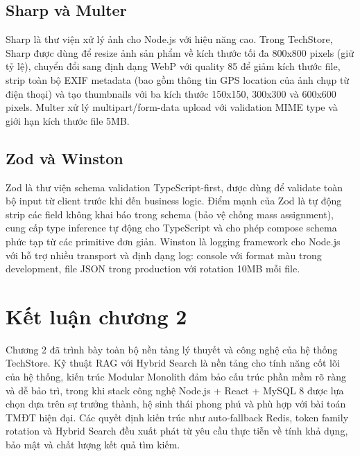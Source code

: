 \subsection{Sharp và Multer}

Sharp là thư viện xử lý ảnh cho Node.js với hiệu năng cao. Trong TechStore, Sharp được dùng để resize ảnh sản phẩm về kích thước tối đa 800x800 pixels (giữ tỷ lệ), chuyển đổi sang định dạng WebP với quality 85 để giảm kích thước file, strip toàn bộ EXIF metadata (bao gồm thông tin GPS location của ảnh chụp từ điện thoại) và tạo thumbnails với ba kích thước 150x150, 300x300 và 600x600 pixels. Multer xử lý multipart/form-data upload với validation MIME type và giới hạn kích thước file 5MB.

\subsection{Zod và Winston}

Zod là thư viện schema validation TypeScript-first, được dùng để validate toàn bộ input từ client trước khi đến business logic. Điểm mạnh của Zod là tự động strip các field không khai báo trong schema (bảo vệ chống mass assignment), cung cấp type inference tự động cho TypeScript và cho phép compose schema phức tạp từ các primitive đơn giản. Winston là logging framework cho Node.js với hỗ trợ nhiều transport và định dạng log: console với format màu trong development, file JSON trong production với rotation 10MB mỗi file.

\section*{Kết luận chương 2}

Chương 2 đã trình bày toàn bộ nền tảng lý thuyết và công nghệ của hệ thống TechStore. Kỹ thuật RAG với Hybrid Search là nền tảng cho tính năng cốt lõi của hệ thống, kiến trúc Modular Monolith đảm bảo cấu trúc phần mềm rõ ràng và dễ bảo trì, trong khi stack công nghệ Node.js + React + MySQL 8 được lựa chọn dựa trên sự trưởng thành, hệ sinh thái phong phú và phù hợp với bài toán TMĐT hiện đại. Các quyết định kiến trúc như auto-fallback Redis, token family rotation và Hybrid Search đều xuất phát từ yêu cầu thực tiễn về tính khả dụng, bảo mật và chất lượng kết quả tìm kiếm.
